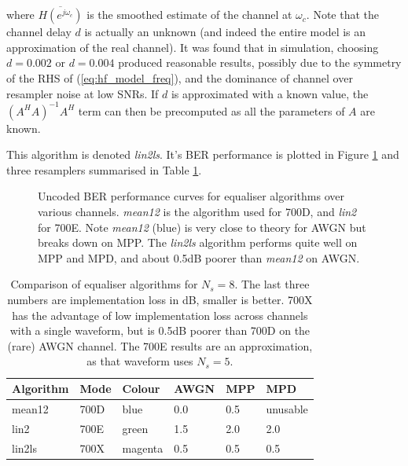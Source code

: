 \documentclass{article}
\begin{document}
where $\overline{H(e^{j \omega_c})}$ is the smoothed estimate of the channel at $\omega_c$.  Note that the channel delay $d$ is actually an unknown (and indeed the entire model is an approximation of the real channel). It was found that in simulation, choosing $d=0.002$ or $d=0.004$ produced reasonable results, possibly due to the symmetry of the RHS of (\ref{eq:hf_model_freq}), and the dominance of channel over resampler noise at low SNRs. If $d$ is approximated with a known value, the $(A^HA)^{-1}A^H$ term can then be precomputed as all the parameters of $A$ are known.

This algorithm is denoted \emph{lin2ls}.  It's BER performance is plotted in Figure \ref{fig:equaliser_curves} and three resamplers summarised in Table \ref{tab:resampler_summary}.

\begin{figure}[H]
\caption{Uncoded BER performance curves for equaliser algorithms over various channels. \emph{mean12} is the algorithm used for 700D, and \emph{lin2} for 700E.  Note \emph{mean12} (blue) is very close to theory for AWGN but breaks down on MPP.  The \emph{lin2ls} algorithm performs quite well on MPP and MPD, and about 0.5dB poorer than \emph{mean12} on AWGN.}
\label{fig:equaliser_curves}
\begin{center}

\end{center}
\end{figure}

\begin{table}[h]
\centering
\begin{tabular}{l l l l l l }
 \hline
 Algorithm & Mode & Colour & AWGN & MPP & MPD \\
 \hline
 mean12 & 700D & blue & 0.0 & 0.5 & unusable \\
 lin2 & 700E & green & 1.5 & 2.0 & 2.0 \\
 lin2ls & 700X & magenta & 0.5 & 0.5 & 0.5 \\
 \hline
\end{tabular}
\caption{Comparison of equaliser algorithms for $N_s=8$. The last three numbers are implementation loss in dB, smaller is better.  700X has the advantage of low implementation loss across channels with a single waveform, but is 0.5dB poorer than 700D on the (rare) AWGN channel.  The 700E results are an approximation, as that waveform uses $N_s=5$. }
\label{tab:resampler_summary}
\end{table}
\end{document}
